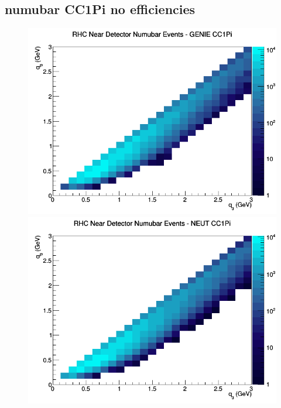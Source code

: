 \subsection{numubar CC1Pi no efficiencies}
\begin{figure}[h]
\includegraphics[width=\linewidth]{q0_q3/nominal/CC1Pi_RHC_ND_numubar_q3_q0_GENIE.png}
\endminipage
{}
\includegraphics[width=\linewidth]{q0_q3/nominal/CC1Pi_RHC_ND_numubar_q3_q0_NEUT.png}
\endminipage
{}

\end{figure}
